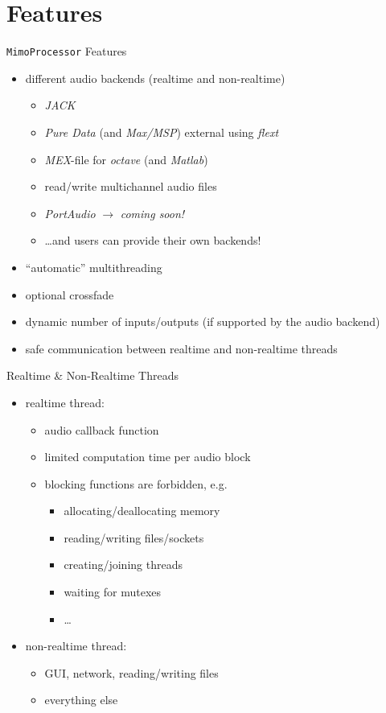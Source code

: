 \documentclass{beamer}
\newcommand{\code}{\texttt}
\begin{document}
\section{Features}

\begin{frame}{\code{MimoProcessor} Features}
\begin{itemize}
\item different audio backends (realtime and non-realtime)
\begin{itemize}
\item \emph{JACK}
\item \emph{Pure Data} {\color{TUBblue}(and \emph{Max/MSP})} external using \emph{flext}
\item \emph{MEX}-file for \emph{octave} {\color{TUBblue}(and \emph{Matlab})}
\item read/write multichannel audio files
\item \emph{PortAudio} {\color{TUBblue}$\to$ \emph{coming soon!}}
\item \dots and users can provide their own backends!
\end{itemize}
\pause
\item ``automatic'' multithreading
\item optional crossfade
\item dynamic number of inputs/outputs
  {\color{TUBblue}(if supported by the audio backend)}
\item safe communication between realtime and non-realtime threads
\end{itemize}
\end{frame}

\begin{frame}{Realtime \& Non-Realtime Threads}
\begin{itemize}
\item realtime thread:
\begin{itemize}
\item audio callback function
\item limited computation time per audio block
\item blocking functions are \alert{forbidden}, e.g.
\begin{itemize}
\item allocating/deallocating memory
\item reading/writing files/sockets
\item creating/joining threads
\item waiting for mutexes
\item \dots
\end{itemize}
\end{itemize}
\pause
\vfill
\item non-realtime thread:
\begin{itemize}
\item GUI, network, reading/writing files
\item everything else
\end{itemize}
\end{itemize}
\end{frame}
\end{document}
